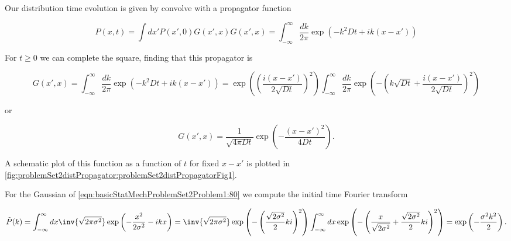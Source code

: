 {Our distribution time evolution is given by convolve with a propagator function

\begin{subequations}
\begin{equation}\label{eqn:basicStatMechProblemSet2Problem1:220}
P(x, t) = \int dx' P(x', 0) G(x', x)
\end{equation}
\begin{equation}\label{eqn:basicStatMechProblemSet2Problem1:240}
G(x', x) 
=
\int_{-\infty}^\infty 
\frac{dk}{2 \pi} 
\exp\left( -k^2 D t + i k (x - x') \right)
\end{equation}
\end{subequations}

For $t \ge 0$ we can complete the square, finding that this propagator is

\begin{dmath}\label{eqn:basicStatMechProblemSet2Problem1:260}
G(x', x) 
=
\int_{-\infty}^\infty 
\frac{dk}{2 \pi} 
\exp\left( -k^2 D t + i k (x - x') \right)
=
\exp\left( \left(\frac{i (x - x')}{2 \sqrt{D t}} \right)^2 \right)
\int_{-\infty}^\infty 
\frac{dk}{2 \pi} 
\exp\left( - \left(k \sqrt{D t} + \frac{i (x - x')}{2 \sqrt{D t}} \right)^2 \right)
\end{dmath}

or

\begin{equation}\label{eqn:basicStatMechProblemSet2Problem1:360}
\boxed{
G(x', x) 
=
\frac{1}{\sqrt{4 \pi D t}} \exp\left(
-\frac{(x - x')^2}{4 D t}
\right).
}
\end{equation}

A schematic plot of this function as a function of $t$ for fixed $x - x'$ is plotted in \cref{fig:problemSet2distPropagator:problemSet2distPropagatorFig1}.



For the Gaussian of \ref{eqn:basicStatMechProblemSet2Problem1:80} we compute the initial time Fourier transform

\begin{dmath}\label{eqn:basicStatMechProblemSet2Problem1:280}
\tilde{P}(k) 
= 
\int_{-\infty}^\infty dx 
\inv{\sqrt{2 \pi \sigma^2}} \exp
\left(
-\frac{x^2}{2 \sigma^2}
-i k x 
\right)
=
\inv{\sqrt{2 \pi \sigma^2}} 
\exp
\left(
-\left( \frac{\sqrt{ 2 \sigma^2}}{2} k i
\right)^2
\right)
\int_{-\infty}^\infty dx 
\exp
\left(
-\left( \frac{x}{\sqrt{2 \sigma^2} } + \frac{\sqrt{ 2 \sigma^2}}{2} k i
\right)^2
\right)
=
\exp\left(
-\frac{\sigma^2 k^2}{2}
\right).
\end{dmath}

}
